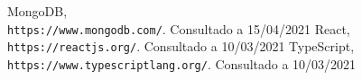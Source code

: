 \documentclass[12pt,a4paper]{article}
\begin{document}
\pagebreak
\begin{thebibliography}{9}    
    MongoDB,\\\texttt{https://www.mongodb.com/}.
    Consultado a 15/04/2021
    React,\\\texttt{https://reactjs.org/}.
    Consultado a 10/03/2021    
    TypeScript,\\\texttt{https://www.typescriptlang.org/}.
    Consultado a 10/03/2021
\end{thebibliography}
\end{document}
